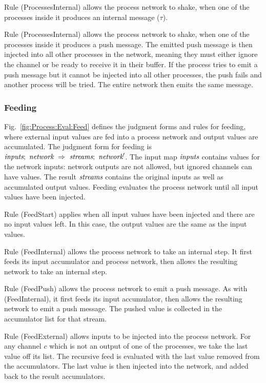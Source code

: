 Rule (ProcessesInternal) allows the process network to shake, when one of the processes inside it produces an internal message ($\tau$).

Rule (ProcessesInternal) allows the process network to shake, when one of the processes inside it produces a push message.
The emitted push message is then injected into all other processes in the network, meaning they must either ignore the channel or be ready to receive it in their buffer.
If the process tries to emit a push message but it cannot be injected into all other processes, the push fails and another process will be tried.
The entire network then emits the same message.

\subsubsection{Feeding}
Fig.~\ref{fig:Process:Eval:Feed} defines the judgment forms and rules for feeding, where external input values are fed into a process network and output values are accumulated.
The judgment form for feeding is $\textit{inputs};~\textit{network}~\Rightarrow~\textit{streams};~\textit{network}'$.
The input map $\textit{inputs}$ contains values for the network inputs: network outputs are not allowed, but ignored channels can have values.
The result $\textit{streams}$ contains the original inputs as well as accumulated output values.
Feeding evaluates the process network until all input values have been injected.


Rule (FeedStart) applies when all input values have been injected and there are no input values left.
In this case, the output values are the same as the input values.

Rule (FeedInternal) allows the process network to take an internal step.
It first feeds its input accumulator and process network, then allows the resulting network to take an internal step.

Rule (FeedPush) allows the process network to emit a push message.
As with (FeedInternal), it first feeds its input accumulator, then allows the resulting network to emit a push message.
The pushed value is collected in the accumulator list for that stream.

Rule (FeedExternal) allows inputs to be injected into the process network.
For any channel $c$ which is not an output of one of the processes, we take the last value off its list.
The recursive feed is evaluated with the last value removed from the accumulators.
The last value is then injected into the network, and added back to the result accumulators.



